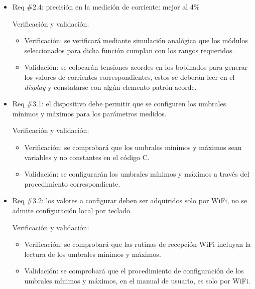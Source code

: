 \documentclass[11pt]{charter}
\begin{document}
\begin{itemize} 
\item Req \#2.4: precisión en la medición de corriente: mejor al 4\% 

Verificación y validación:

\begin{itemize}
\item Verificación: se verificará mediante simulación analógica que los módulos seleccionados para dicha función cumplan con los rangos requeridos.
\item Validación: se colocarán tensiones acordes en los bobinados para generar los valores de corrientes correspondientes, estos se deberán leer en el \textit{display} y constatarse con algún elemento patrón acorde.  
\end{itemize}

\end{itemize}

\begin{itemize} 
\item Req \#3.1: el dispositivo debe permitir que se configuren los umbrales mínimos y máximos para los parámetros medidos. 

Verificación y validación:

\begin{itemize}
\item Verificación: se comprobará que los umbrales mínimos y máximos sean variables y no constantes en el código C.
\item Validación: se configurarán los umbrales mínimos y máximos a través del procedimiento correspondiente.
\end{itemize}

\end{itemize}

\begin{itemize} 
\item Req \#3.2: los valores a configurar deben ser adquiridos solo por WiFi, no se admite configuración local por teclado.

Verificación y validación:

\begin{itemize}
\item Verificación: se comprobará que las rutinas de recepción WiFi incluyan la lectura de los umbrales mínimos y máximos.
\item Validación: se comprobará que el procedimiento de configuración de los umbrales mínimos y máximos, en el manual de usuario, es solo por WiFi. 
\end{itemize}

\end{itemize}
\end{document}
